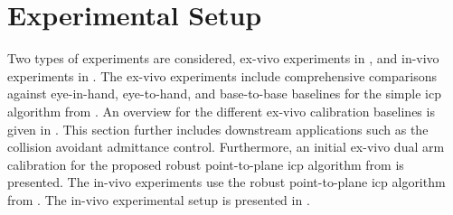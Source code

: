 
\section{Experimental Setup}
\label{c1:sec:experimental_setup}
Two types of experiments are considered, ex-vivo experiments in , and in-vivo experiments in . The ex-vivo experiments include comprehensive comparisons against eye-in-hand, eye-to-hand, and base-to-base baselines for the simple \gls{icp} algorithm from . An overview for the different ex-vivo calibration baselines is given in . This section further includes downstream applications such as the collision avoidant admittance control. Furthermore, an initial ex-vivo dual arm calibration for the proposed robust point-to-plane \gls{icp} algorithm from  is presented. The in-vivo experiments use the robust point-to-plane \gls{icp} algorithm from . The in-vivo experimental setup is presented in .

